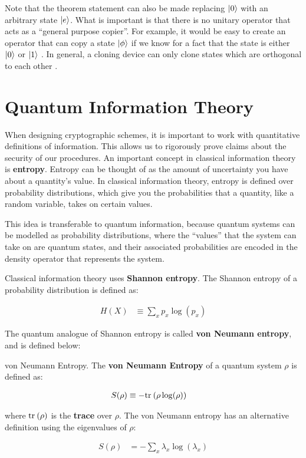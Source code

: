 \begin{remark}
    Note that the theorem statement can also be made replacing $\ket{0}$ with an arbitrary state $\ket{e}$. What is important is that there is no unitary operator that acts as a ``general purpose copier''. For example, it would be easy to create an operator that can copy a state $\ket{\phi}$ if we know for a fact that the state is either $\ket{0}$ or $\ket{1}$ \cite{mermin_quantum_2007}. In general, a cloning device can only clone states which are orthogonal to each other \cite{nielsen_quantum_2010}.
\end{remark}

\section{Quantum Information Theory}
\label{section:qit}

When designing cryptographic schemes, it is important to work with quantitative definitions of information. This allows us to rigorously prove claims about the security of our procedures. An important concept in classical information theory is \textbf{entropy}. Entropy can be thought of as the amount of uncertainty you have about a quantity's value. In classical information theory, entropy is defined over probability distributions, which give you the probabilities that a quantity, like a random variable, takes on certain values.

This idea is transferable to quantum information, because quantum systems can be modelled as probability distributions, where the ``values'' that the system can take on are quantum states, and their associated probabilities are encoded in the density operator that represents the system.

Classical information theory uses \textbf{Shannon entropy}. The Shannon entropy of a probability distribution is defined as:

\begin{align}
    H(X) &\equiv \sum_x p_x \log (p_x)
\end{align}


The quantum analogue of Shannon entropy is called \textbf{von Neumann entropy}, and is defined below:

\begin{definition}{von Neumann Entropy.}
    The \textbf{von Neumann Entropy} of a quantum system $\rho$ is defined as:
    
    \begin{align}
        S(\rho) &\equiv -\text{tr}_{}\left( {\rho \log(\rho)} \right)
    \end{align}
    
    where $\text{tr}_{}\left( {\rho} \right)$ is the \textbf{trace} over $\rho$. The von Neumann entropy has an alternative definition using the eigenvalues of $\rho$:

    \begin{align}
        S(\rho) &= -\sum_x \lambda_x \log(\lambda_x)
    \end{align}
\end{definition}

